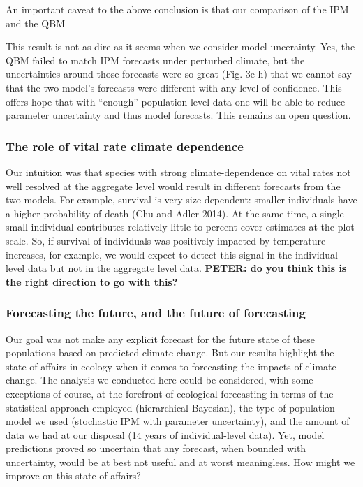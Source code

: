 \documentclass[12pt,]{article}
\begin{document}
An important caveat to the above conclusion is that our comparison of
the IPM and the QBM

This result is not as dire as it seems when we consider model
uncerainty. Yes, the QBM failed to match IPM forecasts under perturbed
climate, but the uncertainties around those forecasts were so great
(Fig. 3e-h) that we cannot say that the two model's forecasts were
different with any level of confidence. This offers hope that with
``enough'' population level data one will be able to reduce parameter
uncertainty and thus model forecasts. This remains an open question.

\subsubsection{The role of vital rate climate
dependence}\label{the-role-of-vital-rate-climate-dependence}

Our intuition was that species with strong climate-dependence on vital
rates not well resolved at the aggregate level would result in different
forecasts from the two models. For example, survival is very size
dependent: smaller individuals have a higher probability of death (Chu
and Adler 2014). At the same time, a single small individual contributes
relatively little to percent cover estimates at the plot scale. So, if
survival of individuals was positively impacted by temperature
increases, for example, we would expect to detect this signal in the
individual level data but not in the aggregate level data.
\textbf{PETER: do you think this is the right direction to go with
this?}

\subsubsection{Forecasting the future, and the future of
forecasting}\label{forecasting-the-future-and-the-future-of-forecasting}

Our goal was not make any explicit forecast for the future state of
these populations based on predicted climate change. But our results
highlight the state of affairs in ecology when it comes to forecasting
the impacts of climate change. The analysis we conducted here could be
considered, with some exceptions of course, at the forefront of
ecological forecasting in terms of the statistical approach employed
(hierarchical Bayesian), the type of population model we used
(stochastic IPM with parameter uncertainty), and the amount of data we
had at our disposal (14 years of individual-level data). Yet, model
predictions proved so uncertain that any forecast, when bounded with
uncertainty, would be at best not useful and at worst meaningless. How
might we improve on this state of affairs?
\end{document}
